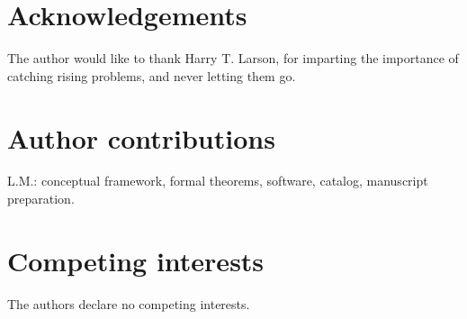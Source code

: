 \documentclass[12pt,a4paper]{article}
\makeatletter
\renewcommand{\_}{\ig@origunderscore\discretionary{}{}{}}
\makeatother
\begin{document}
\section{Acknowledgements}
The author would like to thank Harry T. Larson, for imparting the importance of catching rising problems, and never letting them go.

\section{Author contributions}
L.M.: conceptual framework, formal theorems, software, catalog, manuscript preparation.

\section{Competing interests}
The authors declare no competing interests.
\end{document}
